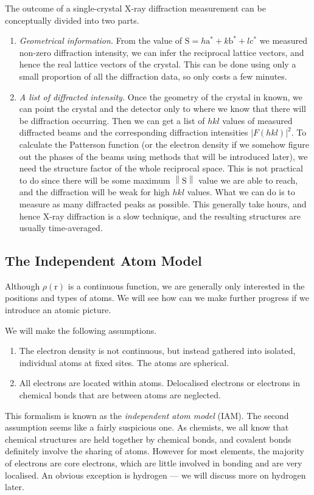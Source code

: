 \documentclass{article}
\theoremstyle{plain}\theoremheaderfont{\normalfont\itshape}\theorembodyfont{\rmfamily}\theoremseparator{.}\newtheorem*{rem}{Remark}\newtheorem*{ex}{Example}\newtheorem*{proof}{Proof}\newtheorem*{altp}{Alternative proof}
\theoremstyle{plain}\theoremheaderfont{\normalfont\bfseries}\theorembodyfont{\rmfamily}\theoremseparator{.}\newtheorem{thm}{Theorem}[section]\newtheorem{lem}[thm]{Lemma}\newtheorem{prop}[thm]{Proposition}\newtheorem*{cor}{Corollary}\newtheorem{defn}[thm]{Definition}\newtheorem{clm}[thm]{Claim}\newtheorem{clminproof}{Claim}\newtheorem*{law}{Law}\newtheorem{pos}[thm]{Postulate}
\theoremstyle{break}\theoremheaderfont{\normalfont\itshape}\theorembodyfont{\rmfamily}\theoremseparator{.\medskip}\newtheorem*{proofskip}{Proof}\newtheorem*{exs}{Examples}\newtheorem*{rems}{Remarks}
\theoremstyle{break}\theoremheaderfont{\normalfont\bfseries}\theorembodyfont{\rmfamily}\theoremseparator{.\medskip}\newtheorem{lemskip}[thm]{Lemma}\newtheorem{defnskip}[thm]{Definition}\newtheorem{propskip}[thm]{Proposition}\newtheorem{thmskip}[thm]{Theorem}
\numberwithin{equation}{section}
\newcommand{\vb}[1]{\bm{\mathrm{#1}}}
\newcommand{\abs}[1]{\left| #1 \right|}
\newcommand{\norm}[1]{\left\| #1 \right\|}
\begin{document}
    The outcome of a single-crystal X-ray diffraction measurement can be conceptually divided into two parts.
    \begin{enumerate}[topsep=0pt]
        \item \textit{Geometrical information.} From the value of \(\vb{S}=h\vb{a}^*+k\vb{b}^*+l\vb{c}^*\) we measured non-zero diffraction intensity, we can infer the reciprocal lattice vectors, and hence the real lattice vectors of the crystal. This can be done using only a small proportion of all the diffraction data, so only costs a few minutes.
        \item \textit{A list of diffracted intensity.} Once the geometry of the crystal in known, we can point the crystal and the detector only to where we know that there will be diffraction occurring. Then we can get a list of \(hkl\) values of measured diffracted beams and the corresponding diffraction intensities \(\abs{F(hkl)}^2\). To calculate the Patterson function (or the electron density if we somehow figure out the phases of the beams using methods that will be introduced later), we need the structure factor of the whole reciprocal space. This is not practical to do since there will be some maximum \(\norm{\vb{S}}\) value we are able to reach, and the diffraction will be weak for high \(hkl\) values. What we can do is to measure as many diffracted peaks as possible. This generally take hours, and hence X-ray diffraction is a slow technique, and the resulting structures are usually time-averaged.
    \end{enumerate}

    \subsection{The Independent Atom Model}
    Although \(\rho(\vb{r})\) is a continuous function, we are generally only interested in the positions and types of atoms. We will see how can we make further progress if we introduce an atomic picture.

    We will make the following assumptions.
    \begin{enumerate}[topsep=0pt]
        \item The electron density is not continuous, but instead gathered into isolated, individual atoms at fixed sites. The atoms are spherical.
        \item All electrons are located within atoms. Delocalised electrons or electrons in chemical bonds that are between atoms are neglected.
    \end{enumerate}
    This formalism is known as the \textit{independent atom model} (IAM). The second assumption seems like a fairly suspicious one. As chemists, we all know that chemical structures are held together by chemical bonds, and covalent bonds definitely involve the sharing of atoms. However for most elements, the majority of electrons are core electrons, which are little involved in bonding and are very localised. An obvious exception is hydrogen --- we will discuss more on hydrogen later.
\end{document}
